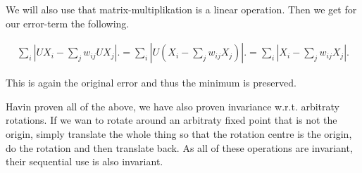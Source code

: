 We will also use that matrix-multiplikation is a linear operation.
Then we get for our error-term the following.

\begin{align*}
	 \sum_i | UX_i - \sum_j w_{ij} UX_j|. = 	 \sum_i | U(X_i - \sum_j w_{ij} X_j)|. = \sum_i | X_i - \sum_j w_{ij} X_j|.
\end{align*}

This is again the original error and thus the minimum is preserved.

Havin proven all of the above, we have also proven invariance w.r.t. arbitraty rotations. If we wan to rotate around an arbitraty fixed point that is not the origin, simply translate the whole thing so that the rotation centre is the origin, do the rotation and then translate back. As all of these operations are invariant, their sequential use is also invariant.

